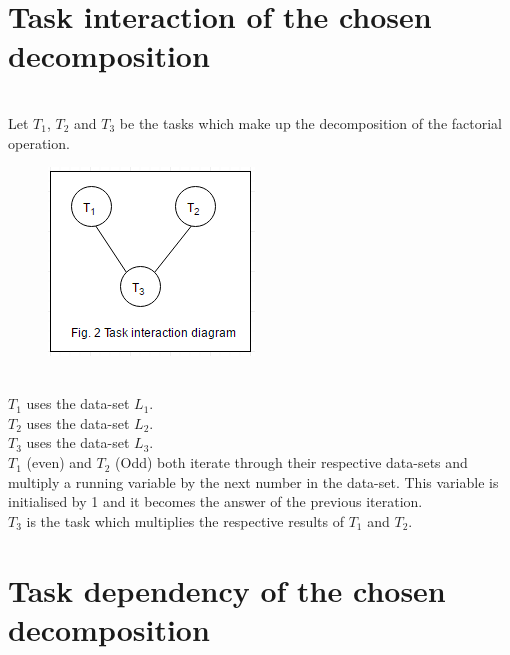 \documentclass[11pt]{article}
\begin{document}
\begin{page}
\break

\noindent \chapter{Task interaction of the chosen decomposition} \\

\noindent Let $T_1$, $T_2$ and $T_3$ be the tasks which make up the decomposition of the factorial operation.\\

\begin{figure}[ht]
\centering
     \includegraphics[scale=1]{parallel_fig_2}
\end{figure}
\\

\noindent $T_1$ uses the data-set $L_1$.\\
\noindent $T_2$ uses the data-set $L_2$.\\
\noindent $T_3$ uses the data-set $L_3$.\\

\noindent $T_1$ (even) and $T_2$ (Odd) both iterate through their respective data-sets and multiply a running variable by the next number in the data-set.
This variable is initialised by 1 and it becomes the answer of the previous iteration. \\
\noindent $T_3$ is the task which multiplies the respective results of $T_1$ and $T_2$.\\

\break
\noindent \chapter{Task dependency of the chosen decomposition} \\


\end{page}
\end{document}
